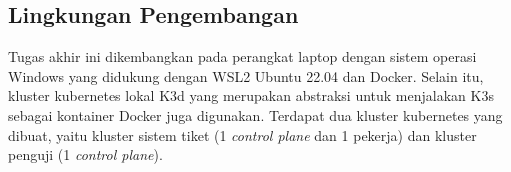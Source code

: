 \subsection{Lingkungan Pengembangan}

Tugas akhir ini dikembangkan pada perangkat laptop dengan sistem operasi Windows yang didukung dengan WSL2 Ubuntu 22.04 dan Docker. Selain itu, kluster kubernetes lokal K3d yang merupakan abstraksi untuk menjalakan K3s sebagai kontainer Docker juga digunakan. Terdapat dua kluster kubernetes yang dibuat, yaitu kluster sistem tiket (1 \textit{control plane} dan 1 pekerja) dan kluster penguji (1 \textit{control plane}).
